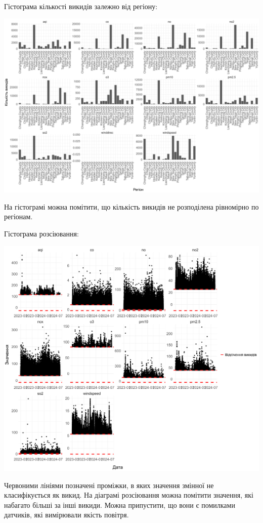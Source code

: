 \documentclass{article}
\begin{document}
\begin{enumerate}
    Гістограма кількості викидів залежно від регіону:

    \includegraphics[width=6in]{plots/outliers/count-bar-county.png}

    На гістограмі можна помітити, що кількість викидів не розподілена рівномірно
    по регіонам.

    \pagebreak

    Гістограма розсіювання:

    \includegraphics[width=6in]{plots/outliers/scatter.png}

    Червоними лініями позначені проміжки, в яких значення змінної не класифікується
    як викид. На діаграмі розсіювання можна помітити значення, які набагато більші за
    інші викиди. Можна припустити, що вони є помилками датчиків, які вимірювали якість
    повітря.


\end{enumerate}
\end{document}
